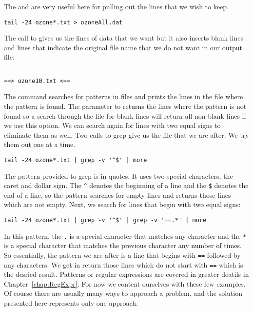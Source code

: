 The  and  are very useful here for
pulling out the lines that we wish to keep.  
\begin{verbatim}
tail -24 ozone*.txt > ozoneAll.dat
\end{verbatim}
The call to  gives us the lines of data that we want
but it also inserts blank lines and lines that indicate the original
file name that we do not want in our output file:
\begin{verbatim}

==> ozone10.txt <==
\end{verbatim}
The  command searches for patterns in files and prints
the lines in the file where the pattern is found.  The 
parameter to  returns the lines where the pattern is
not found so a search through the file for blank lines will return all
non-blank lines if we use this option.  We can search again for lines
with two equal signs to eliminate them as well.  Two calls to grep
give us the file that we are after.  We try them out one at a time.
\begin{verbatim}
tail -24 ozone*.txt | grep -v '^$' | more
\end{verbatim}
The pattern provided to grep is in quotes.  It uses two special
characters, the caret and dollar sign.  The \verb+^+ denotes the
beginning of a line and the \verb+$+ denotes the end of a line, so the
pattern searches for empty lines and returns those lines which are not
empty. Next, we search for lines that begin with two equal signs:
\begin{verbatim}
tail -24 ozone*.txt | grep -v '^$' | grep -v '==.*' | more
\end{verbatim}
In this pattern, the \verb+.+ is a special character that matches any
character and the \verb+*+ is a special character that matches the
previous character any number of times.  So essentially, the pattern
we are after is a line that begins with \verb+==+ followed by any
characters.  We get in return those lines which do not start with
\verb+==+ which is the desried result.  Patterns or regular
expressions are covered in greater deatils in
Chapter~\ref{chap:RegExpr}.  For now we content ourselves with these
few examples.  Of course there are usually many ways to approach a
problem, and the solution presented here represents only one approach.  


